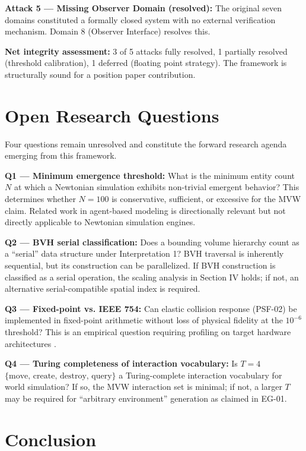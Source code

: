 \documentclass[conference]{IEEEtran}
\begin{document}
\textbf{Attack 5 --- Missing Observer Domain (resolved):} The original seven
domains constituted a formally closed system with no external verification
mechanism. Domain 8 (Observer Interface) resolves this.

\textbf{Net integrity assessment:} 3 of 5 attacks fully resolved, 1 partially
resolved (threshold calibration), 1 deferred (floating point strategy). The
framework is structurally sound for a position paper contribution.

\section{Open Research Questions}

Four questions remain unresolved and constitute the forward research agenda
emerging from this framework.

\textbf{Q1 --- Minimum emergence threshold:} What is the minimum entity count $N$
at which a Newtonian simulation exhibits non-trivial emergent behavior? This
determines whether $N=100$ is conservative, sufficient, or excessive for the MVW
claim. Related work in agent-based modeling \cite{axelrod1997, epstein1996} is
directionally relevant but not directly applicable to Newtonian simulation engines.

\textbf{Q2 --- BVH serial classification:} Does a bounding volume hierarchy count
as a ``serial'' data structure under Interpretation 1? BVH traversal is inherently
sequential, but its construction can be parallelized. If BVH construction is
classified as a serial operation, the scaling analysis in Section IV holds; if not,
an alternative serial-compatible spatial index is required.

\textbf{Q3 --- Fixed-point vs. IEEE 754:} Can elastic collision response (PSF-02)
be implemented in fixed-point arithmetic without loss of physical fidelity at the
$10^{-6}$ threshold? This is an empirical question requiring profiling on target
hardware architectures \cite{sterbenz1974}.

\textbf{Q4 --- Turing completeness of interaction vocabulary:} Is $T=4$
$\{\text{move, create, destroy, query}\}$ a Turing-complete interaction vocabulary
for world simulation? If so, the MVW interaction set is minimal; if not, a larger
$T$ may be required for ``arbitrary environment'' generation as claimed in EG-01.

\section{Conclusion}
\end{document}
